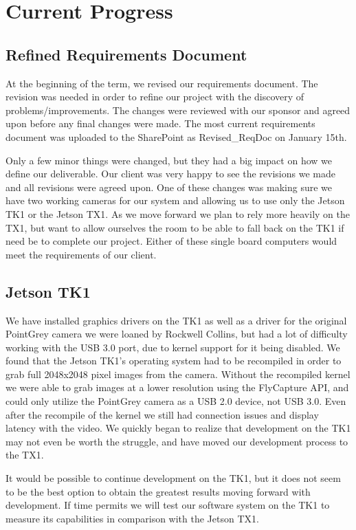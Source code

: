 \documentclass[letterpaper,10pt,titlepage]{IEEEtran}
\begin{document}
   \section{Current Progress}
   \subsection{Refined Requirements Document}
   At the beginning of the term, we revised our requirements document. The revision was needed in order to refine our project with the discovery of problems/improvements. The changes were reviewed with our sponsor and agreed upon before any final changes were made. The most current requirements document was uploaded to the SharePoint as Revised\_ReqDoc on January 15th.\\ 
\par
Only a few minor things were changed, but they had a big impact on how we define our deliverable. Our client was very happy to see the revisions we made and all revisions were agreed upon. One of these changes was making sure we have two working cameras for our system and allowing us to use only the Jetson TK1 or the Jetson TX1. As we move forward we plan to rely more heavily on the TX1, but want to allow ourselves the room to be able to fall back on the TK1 if need be to complete our project. Either of these single board computers would meet the requirements of our client.
   
   \subsection{Jetson TK1}
   We have installed graphics drivers on the TK1 as well as a driver for the original PointGrey camera we were loaned by Rockwell Collins, but had a lot of difficulty working with the USB 3.0 port, due to kernel support for it being disabled. We found that the Jetson TK1's operating system had to be recompiled in order to grab full 2048x2048 pixel images from the camera. Without the recompiled kernel we were able to grab images at a lower resolution using the FlyCapture API, and could only utilize the PointGrey camera as a USB 2.0 device, not USB 3.0. Even after the recompile of the kernel we still had connection issues and display latency with the video. We quickly began to realize that development on the TK1 may not even be worth the struggle, and have moved our development process to the TX1.\\ 
\par
It would be possible to continue development on the TK1, but it does not seem to be the best option to obtain the greatest results moving forward with development. If time permits we will test our software system on the TK1 to measure its capabilities in comparison with the Jetson TX1.
   
\end{document}
